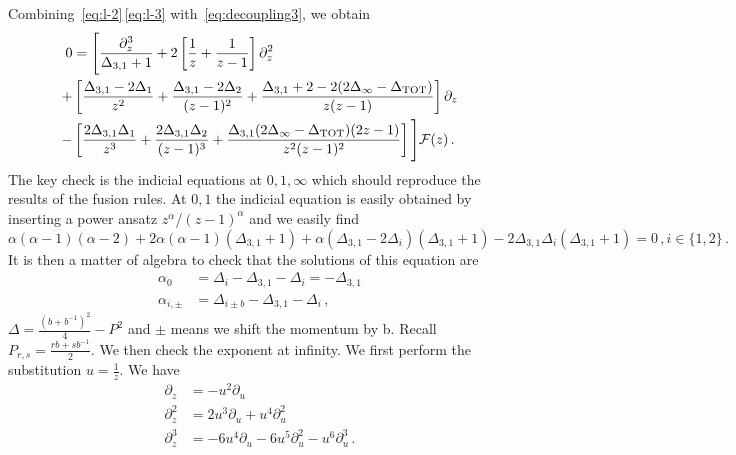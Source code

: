 \documentclass[a4paper]{article}
\begin{document}
Combining~\eqref{eq:l-2}\,\eqref{eq:l-3} with~\eqref{eq:decoupling3}, we obtain
\begin{equation}
  \begin{aligned}
    0 &= \Bigg[\frac{\partial_z^3}{\Delta_{3,1}+1} + 2 \left[\frac{1}{z}+\frac{1}{z-1}\right]\partial^2_z \\
    +&\left[\frac{\Delta_{3,1}-2\Delta_1}{z^2} + \frac{\Delta_{3,1}-2\Delta_2}{(z-1)^2}+\frac{\Delta_{3,1}+2-2(2\Delta_{\infty}-\Delta_{\rm TOT})}{z(z-1)}\right]\partial_z \\
    -&\left[\frac{2\Delta_{3,1}\Delta_1}{z^3}+\frac{2\Delta_{3,1}\Delta_2}{(z-1)^3}+\frac{\Delta_{3,1}(2\Delta_{\infty}-\Delta_{\rm TOT})(2z-1)}{z^2(z-1)^2}\right]
    \Bigg] \mathcal{F}(z)\,.
  \end{aligned}
\end{equation}
The key check is the indicial equations at $0,1,\infty$ which should reproduce the results of the fusion rules. At $0,1$ the indicial equation is easily obtained by inserting a power ansatz $z^\alpha$/$(z-1)^\alpha$ and we easily find
\begin{equation}
  \alpha(\alpha-1)(\alpha-2)+2\alpha(\alpha-1)(\Delta_{3,1}+1)+\alpha(\Delta_{3,1}-2\Delta_i)(\Delta_{3,1}+1)-2\Delta_{3,1}\Delta_i(\Delta_{3,1}+1)=0\,,i\in\{1,2\}\,.
\end{equation}
It is then a matter of algebra to check that the solutions of this equation are
\begin{equation}
  \begin{aligned}
    \alpha_{0} &= \Delta_{i} - \Delta_{3,1} - \Delta_{i} = -\Delta_{3,1} \\
    \alpha_{i , \pm} &= \Delta_{i \pm b} - \Delta_{3,1} - \Delta_{i}\,,
  \end{aligned}
\end{equation}
$\Delta = \frac{(b+b^{-1})^2}{4}-P^2$ and $\pm$ means we shift the momentum by b. Recall $P_{r,s} = \frac{rb+sb^{-1}}{2}$. We then check the exponent at infinity. We first perform the substitution $u=\frac{1}{z}$. We have
\begin{equation}
\begin{aligned}
   \partial_z &= -u^2 \partial_u \\
   \partial_z^2 &= 2u^3 \partial_u +u^4 \partial_u^2 \\
   \partial_z^3 &= -6u^4 \partial_u -6u^5 \partial^2_u -u^6 \partial_u^3\,.\\
\end{aligned}
\end{equation}
\end{document}
